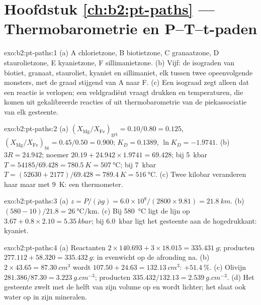 \section*{Hoofdstuk \ref{ch:b2:pt-paths} --- Thermobarometrie en P--T--t-paden}

\begin{solution}{exo:b2:pt-paths:1}
(a) A chlorietzone, B biotietzone, C granaatzone, D staurolietzone, E kyanietzone,
F sillimanietzone. (b) Vijf: de isograden van biotiet, granaat, stauroliet, kyaniet en sillimaniet,
elk tussen twee opeenvolgende monsters, met de graad stijgend van A naar F. (c) Een isograad
zegt alleen dat een reactie is verlopen; een veldgradiënt vraagt drukken en temperaturen, die
komen uit gekalibreerde reacties of uit thermobarometrie van de piekassociatie van elk
gesteente.
\end{solution}

\begin{solution}{exo:b2:pt-paths:2}
(a) $(X_{\text{Mg}}/X_{\text{Fe}})_{\text{grt}} = 0.10/0.80 = 0.125$,
$(X_{\text{Mg}}/X_{\text{Fe}})_{\text{bt}} = 0.45/0.50 = 0.900$; $K_D = 0.1389$, $\ln K_D =
-1.9741$. (b) $3R = 24.942$; noemer $20.19 + 24.942\times1.9741 = 69.428$; bij
\qty{5}{kbar} $T = 54185/69.428 = \qty{780.5}{K} = \qty{507}{\celsius}$; bij
\qty{7}{kbar} $T = (52630 + 2177)/69.428 = \qty{789.4}{K} = \qty{516}{\celsius}$.
(c) Twee kilobar veranderen haar maar met \qty{9}{K}: een thermometer.
\end{solution}

\begin{solution}{exo:b2:pt-paths:3}
(a) $z = P/(\bar\rho g) = 6.0\times10^8/(2800\times9.81) = \qty{21.8}{km}$.
(b) $(580 - 10)/21.8 = \qty{26}{\celsius\per\km}$. (c) Bij \qty{580}{\celsius} ligt de lijn
op $3.67 + 0.8\times2.10 = \qty{5.35}{kbar}$; bij \qty{6.0}{kbar} ligt het gesteente aan de
hogedrukkant: kyaniet.
\end{solution}

\begin{solution}{exo:b2:pt-paths:4}
(a) Reactanten $2\times140.693 + 3\times18.015 = \qty{335.431}{g}$; producten $277.112 +
58.320 = \qty{335.432}{g}$: in evenwicht op de afronding na. (b) $2\times43.65 =
\qty{87.30}{cm^3}$ wordt $107.50 + 24.63 = \qty{132.13}{cm^3}$: $+\qty{51.4}{\percent}$.
(c) Olivijn $281.386/87.30 = \qty{3.223}{g.cm^{-3}}$; producten $335.432/132.13 =
\qty{2.539}{g.cm^{-3}}$. (d) Het gesteente zwelt met de helft van zijn volume op en wordt lichter; het
slaat ook water op in zijn mineralen.
\end{solution}

